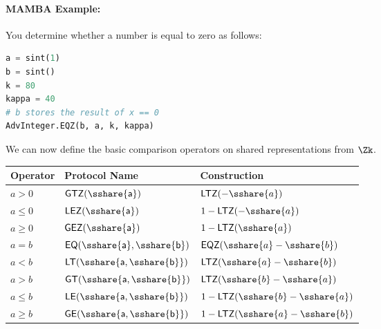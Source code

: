   \paragraph{MAMBA Example:} You determine whether a number is equal to zero as follows:
  \begin{lstlisting}[language={python}]
a = sint(1)
b = sint()
k = 80
kappa = 40
# b stores the result of x == 0
AdvInteger.EQZ(b, a, k, kappa)
\end{lstlisting}


  We can now define the basic comparison operators on shared
  representations from $\Zk$.
  \begin{center}
    \begin{tabular}{|lll|}
      \hline
      Operator & Protocol Name                        & Construction                            \\
      \hline
      $a>0$    & $\mathsf{GTZ(\sshare{a})}$           & $\mathsf{LTZ}(-\sshare{a})$             \\
      $a\le0$  & $\mathsf{LEZ(\sshare{a})}$           & $1-\mathsf{LTZ}(-\sshare{a})$           \\
      $a\ge0$  & $\mathsf{GEZ(\sshare{a})}$           & $1-\mathsf{LTZ}(\sshare{a})$            \\
      $a=b$    & $\mathsf{EQ(\sshare{a},\sshare{b})}$ & $\mathsf{EQZ}(\sshare{a}-\sshare{b})$   \\
      $a<b$    & $\mathsf{LT(\sshare{a,\sshare{b}})}$ & $\mathsf{LTZ}(\sshare{a}-\sshare{b})$   \\
      $a>b$    & $\mathsf{GT(\sshare{a,\sshare{b}})}$ & $\mathsf{LTZ}(\sshare{b}-\sshare{a})$   \\
      $a\le b$ & $\mathsf{LE(\sshare{a,\sshare{b}})}$ & $1-\mathsf{LTZ}(\sshare{b}-\sshare{a})$ \\
      $a\ge b$ & $\mathsf{GE(\sshare{a,\sshare{b}})}$ & $1-\mathsf{LTZ}(\sshare{a}-\sshare{b})$ \\
      \hline
    \end{tabular}
  \end{center}


